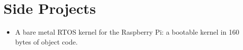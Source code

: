 \section*{Side Projects}
\vspace{-2mm}

\begin{itemize}
    \item A bare metal RTOS kernel for the Raspberry Pi: a bootable kernel
        in 160 bytes of object code.
    \end{itemize}


